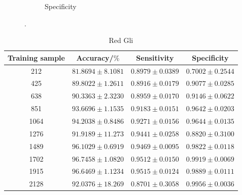 \begin{figure}[H]
\begin{subfigure}[b]{0.48\textwidth}
    \caption{Specificity}
    \label{fig:gli-red-spec}
  \end{subfigure}
  \caption{.}
  \label{fig:gli-men-gliored}
\end{figure}

\begin{table}[H]
    \centering
    {\small
        \begin{tabular}{cccc}
            \toprule
            Training sample & Accuracy/$\%$ & Sensitivity & Specificity\\
            \midrule
            212  & $81.8694 \pm 8.1081$ & $0.8979 \pm 0.0389$ & $0.7002 \pm 0.2544$ \\
            425  & $89.8022 \pm 1.2611$ & $0.8916 \pm 0.0179$ & $0.9077 \pm 0.0285$ \\
            638  & $90.3363 \pm 2.3230$ & $0.8959 \pm 0.0170$ & $0.9146 \pm 0.0622$ \\
            851  & $93.6696 \pm 1.1535$ & $0.9183 \pm 0.0151$ & $0.9642 \pm 0.0203$ \\
            1064 & $94.2038 \pm 0.8486$ & $0.9271 \pm 0.0156$ & $0.9644 \pm 0.0135$ \\
            1276 & $91.9189 \pm 11.273$ & $0.9441 \pm 0.0258$ & $0.8820 \pm 0.3100$ \\
            1489 & $96.1029 \pm 0.6919$ & $0.9469 \pm 0.0095$ & $0.9822 \pm 0.0118$ \\
            1702 & $96.7458 \pm 1.0820$ & $0.9512 \pm 0.0150$ & $0.9919 \pm 0.0069$ \\
            1915 & $96.6469 \pm 1.1234$ & $0.9515 \pm 0.0124$ & $0.9889 \pm 0.0111$ \\
            2128 & $92.0376 \pm 18.269$ & $0.8701 \pm 0.3058$ & $0.9956 \pm 0.0036$ \\
            \bottomrule
        \end{tabular}}
  \caption{Red Gli}
  \label{tab:}
\end{table}

